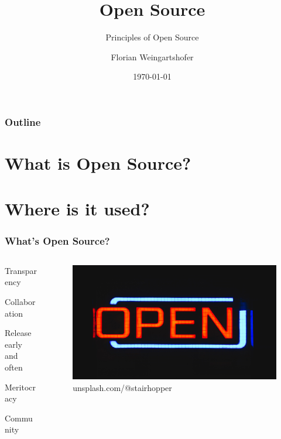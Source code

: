 \documentclass{beamer}
\title{Open Source}
\subtitle{Principles of Open Source}
\author{Florian Weingartshofer}
\institute{FH Hagenberg}
\date{\today}
\begin{document}
\titlepage

\begin{frame}
  \frametitle{Outline}
  \tableofcontents
\end{frame}

\section{What is Open Source?}
\section{Where is it used?}

\begin{frame}
  \frametitle{What's Open Source?}
  \begin{columns}
    \begin{column}{0.5\textwidth}
      \begin{center}
        \Large
        Transparency

        Collaboration

        Release early and often

        Meritocracy

        Community
      \end{center}
    \end{column}
    \begin{column}{0.5\textwidth}  %
      \begin{center}
        \begin{figure}
          \includegraphics[scale=0.03]{./img/open.jpg}
          \caption{unsplash.com/@stairhopper}
        \end{figure}
      \end{center}
    \end{column}
  \end{columns}
\end{frame}
\end{document}
